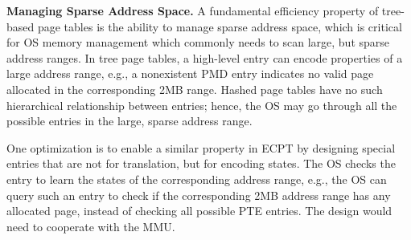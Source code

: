 \noindent
{\bf Managing Sparse Address Space.}
\label{emt:sec:reflection:sparse}
A fundamental efficiency property of tree-based page tables is the 
	ability to manage sparse address space, which is critical for 
	OS memory management which commonly needs to scan large, but sparse address ranges.
In tree page tables, a high-level entry
	can encode properties of a large address range, e.g.,
	a nonexistent PMD entry indicates no valid page allocated in the corresponding 2MB range.
Hashed page tables have no such hierarchical relationship between entries;
	hence, the OS may go through all the possible entries in the large, sparse address range.

One optimization is to enable a similar property in ECPT by designing 
	special entries that are not for translation, but for encoding states. 
The OS checks the entry to learn the states of the corresponding address range, e.g.,
	the OS can query such an entry to check if the corresponding 2MB address range has 
	any allocated page, instead of checking all possible PTE entries.
The design would need to cooperate with the MMU. %

